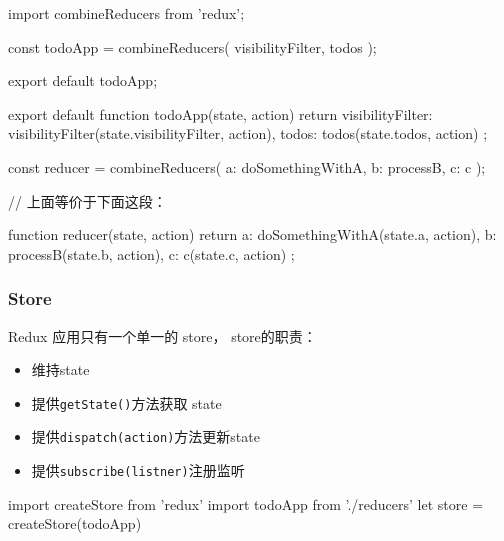 \begin{JavaScript}[使用Redux提供的工具]

import { combineReducers } from 'redux';

const todoApp = combineReducers({
  visibilityFilter,
  todos
});

export default todoApp;

\end{JavaScript}

\begin{JavaScript}[上面的代码完全等价于]

export default function todoApp(state, action) {
  return {
    visibilityFilter: visibilityFilter(state.visibilityFilter, action),
    todos: todos(state.todos, action)
  };
}

\end{JavaScript}

\begin{JavaScript}[再次说明]

const reducer = combineReducers({
  a: doSomethingWithA,
  b: processB,
  c: c
});


// 上面等价于下面这段：

function reducer(state, action) {
  return {
    a: doSomethingWithA(state.a, action),
    b: processB(state.b, action),
    c: c(state.c, action)
  };
}

\end{JavaScript}

\subsubsection{Store}

Redux 应用只有一个单一的 store， store的职责：
\begin{itemize}

\item 维持state 

\item 提供\lstinline$getState()$方法获取 state

\item 提供\lstinline$dispatch(action)$方法更新state

\item 提供\lstinline$subscribe(listner)$注册监听

\end{itemize}

\begin{JavaScript}[使用已有的reduce来创建]

import { createStore } from 'redux'
import todoApp from './reducers'
let store = createStore(todoApp)

\end{JavaScript}

